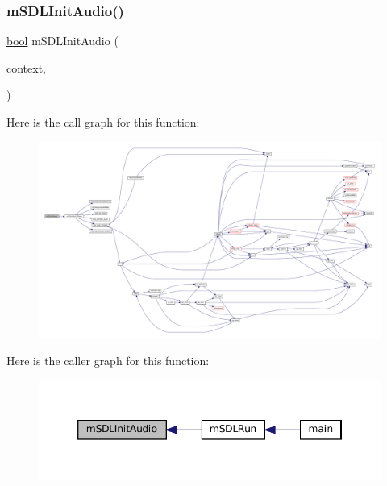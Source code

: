 \subsubsection{\texorpdfstring{m\+S\+D\+L\+Init\+Audio()}{mSDLInitAudio()}}
{\footnotesize\ttfamily \mbox{\hyperlink{libretro_8h_a4a26dcae73fb7e1528214a068aca317e}{bool}} m\+S\+D\+L\+Init\+Audio (\begin{DoxyParamCaption}\item[{struct \mbox{\hyperlink{sdl-audio_8h_structm_s_d_l_audio}{m\+S\+D\+L\+Audio}} $\ast$}]{context,  }\item[{struct m\+Core\+Thread $\ast$}]{ }\end{DoxyParamCaption})}

Here is the call graph for this function\+:
\nopagebreak
\begin{figure}[H]
\begin{center}
\leavevmode
\includegraphics[width=350pt]{sdl-audio_8h_a1c75685e8415e4fe15ff64454b121d53_cgraph}
\end{center}
\end{figure}
Here is the caller graph for this function\+:
\nopagebreak
\begin{figure}[H]
\begin{center}
\leavevmode
\includegraphics[width=346pt]{sdl-audio_8h_a1c75685e8415e4fe15ff64454b121d53_icgraph}
\end{center}
\end{figure}
\mbox{\label{sdl-audio_8h_a6fd4770ab1d4825f5f3231ce155d4696}} 
